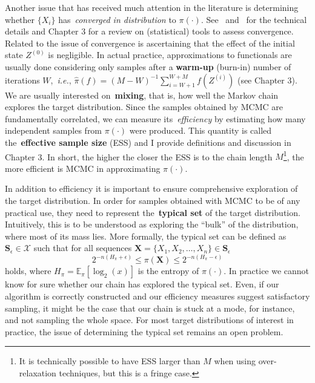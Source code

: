 Another issue that has received much attention in the literature is determining whether $\{X_i\}$ has~\textit{converged in distribution} to $\pi(\cdot)$.
See~\cite{Robert2004} and~\cite{Meyn2012} for the technical details and Chapter 3 for a review on (statistical) tools to assess convergence.
Related to the issue of convergence is ascertaining that the effect of the initial state $Z^{(0)}$ is negligible.
In actual practice, approximations to functionals are usually done considering only samples after a \textbf{warm-up} (burn-in) number of iterations $W$,~\textit{i.e.}, $ \hat{\pi}(f) = (M - W)^{-1}\sum_{i = W + 1}^{W + M} f(Z^{(i)})$ (see Chapter 3).
We are usually interested on~\textbf{mixing}, that is, how well the Markov chain explores the target distribution.
Since the samples obtained by MCMC are fundamentally correlated, we can measure its~\textit{efficiency} by estimating how many independent samples from $\pi(\cdot)$ were produced.
This quantity is called the~\textbf{effective sample size} (ESS) and I provide definitions and discussion in Chapter 3.
In short, the higher the closer the ESS is to the chain length $M$\footnote{It is technically possible to have ESS larger than $M$ when using over-relaxation techniques, but this is a fringe case.}, the more efficient is MCMC in approximating $\pi(\cdot)$.

In addition to efficiency it is important to ensure comprehensive exploration of the target distribution.
In order for samples obtained with MCMC to be of any practical use, they need to represent the~\textbf{typical set} of the target distribution.
Intuitively, this is to be understood as exploring the ``bulk'' of the distribution, where most of its mass lies.
More formally, the typical set can be defined as $\boldsymbol S_\epsilon \in \mathcal{X}$ such that for all sequences $\boldsymbol X = \{X_1, X_2, \ldots, X_n \} \in \boldsymbol S_\epsilon$
\[ 2^{-n\left(H_\pi  + \epsilon\right)} \leq \pi(\boldsymbol X ) \leq 2^{-n\left(H_\pi -\epsilon\right)} \]
holds, where $H_\pi = \mathbb{E}_\pi[\log_2(x)]$ is the entropy of $\pi(\cdot)$. 
In practice we cannot know for sure whether our chain has explored the typical set.
Even, if our algorithm is correctly constructed and our efficiency measures suggest satisfactory sampling, it might be the case that our chain is stuck at a mode, for instance, and not sampling the whole space.
For most target distributions of interest in practice, the issue of determining the typical set remains an open problem.

